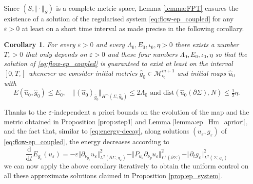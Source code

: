 \documentclass[10pt,reqno]{amsart}
\theoremstyle{plain}
\newtheorem{cor}[lemma]{Corollary}
\theoremstyle{definition}
\numberwithin{equation}{section}
\newcommand{\La}{\Lambda}
\newcommand{\Si}{\Sigma}
\newcommand{\ep}{\varepsilon}
\newcommand{\norm}[1]{\Vert#1\Vert}
\newcommand{\beq}{\begin{equation}}
\newcommand{\eeq}{\end{equation}}
\newcommand{\thalf}{\tfrac{1}{2}}
\newcommand{\dd}{\mathrm{d}} %
\newcommand{\pt}{\partial_t}
\newcommand{\eps}{\varepsilon}
\newcommand{\dist}{\text{dist}}
\newcommand{\pSi}{{\partial \Sigma}}
\newcommand{\MM}{\mathcal{M}} %
\newcommand{\p}{\partial} %
\newcommand{\MMiota}{\MM_{\iota_0}}
\begin{document}
Since $(S,\norm{\cdot}_{S})$ is a complete metric space, Lemma \ref{lemma:FPT} ensures the existence of a solution of the regularised system \eqref{eq:flow-ep_coupled} for any $\eps>0$ at least on a short time interval as made precise in the following corollary. 


\begin{cor}\label{cor:new-FPT}
For every $\eps>0$ and every $\La_0, E_0, \iota_0,\eta>0$ there exists a number $T_\eps>0$ that only depends on $\eps>0$ and these four numbers  $\La_0, E_0, \iota_0, \eta$ so that the solution of \eqref{eq:flow-ep_coupled} is guaranteed to exist at least on the interval $[0,T_\eps]$ whenever we consider initial metrics $\hat g_0\in \MMiota^{m+1}$ and initial maps $\hat u_0$ with 
 $$E(\hat u_0,\hat g_0) \leq E_0, \quad \norm{(\hat u_0)_{\hat g_0}}_{H^m(\Si,\hat{g}_0)}\leq 2\La_0 \text{ and }\dist(\hat u_0(\pSi),N)\leq \thalf \eta.$$
 \end{cor}
 
Thanks to the $\eps$-independent a priori bounds on the evolution of the map and the metric obtained in Proposition \ref{prop:step1} and Lemma \ref{lemma:ep_Hm_apriori}, and the fact that, similar to \eqref{eq:energy-decay}, along solutions $(u_\eps,g_\eps)$ of \eqref{eq:flow-ep_coupled}, the energy decreases according to 
\beq\label{est:energy_decreas_eps}
    \frac{\dd}{\dd t} E_{g_\eps}(u_\eps)=-\ep\norm{\p_{\nu_{g_\eps}}u_\eps}_{L^2(\p\Si,g_\eps)}^2-\norm{P_{u_\eps}\p_{\nu_g}u_\eps}_{L^2(\p\Si)}^2-\norm{\pt g_\eps}_{L^2(\Si,g_\eps)}^2
\eeq
we can now apply the above corollary iteratively to obtain the uniform control on all these approximate solutions claimed in Proposition \ref{prop:ep_system}.
\end{document}
